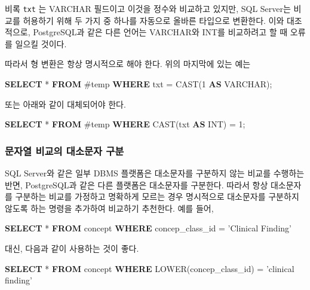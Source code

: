 \documentclass[11pt]{book}
\newenvironment{Shaded}{\begin{snugshade}}{\end{snugshade}}
\newcommand{\KeywordTok}[1]{\textcolor[rgb]{0.13,0.29,0.53}{\textbf{#1}}}
\newcommand{\DataTypeTok}[1]{\textcolor[rgb]{0.13,0.29,0.53}{#1}}
\newcommand{\DecValTok}[1]{\textcolor[rgb]{0.00,0.00,0.81}{#1}}
\newcommand{\StringTok}[1]{\textcolor[rgb]{0.31,0.60,0.02}{#1}}
\newcommand{\FunctionTok}[1]{\textcolor[rgb]{0.00,0.00,0.00}{#1}}
\newcommand{\NormalTok}[1]{#1}
\theoremstyle{definition}
\theoremstyle{definition}
\theoremstyle{definition}
\theoremstyle{remark}
\begin{document}
비록 \texttt{txt} 는 VARCHAR 필드이고 이것을 정수와 비교하고 있지만, SQL
Server는 비교를 허용하기 위해 두 가지 중 하나를 자동으로 올바른 타입으로
변환한다. 이와 대조적으로, PostgreSQL과 같은 다른 언어는 VARCHAR와 INT를
비교하려고 할 때 오류를 일으킬 것이다.

따라서 형 변환은 항상 명시적으로 해야 한다. 위의 마지막에 있는 예는

\begin{Shaded}
\begin{Highlighting}[]
\KeywordTok{SELECT}\NormalTok{ * }\KeywordTok{FROM}\NormalTok{ #temp }\KeywordTok{WHERE}\NormalTok{ txt = }\FunctionTok{CAST}\NormalTok{(}\DecValTok{1} \KeywordTok{AS} \DataTypeTok{VARCHAR}\NormalTok{);}
\end{Highlighting}
\end{Shaded}

또는 아래와 같이 대체되어야 한다.

\begin{Shaded}
\begin{Highlighting}[]
\KeywordTok{SELECT}\NormalTok{ * }\KeywordTok{FROM}\NormalTok{ #temp }\KeywordTok{WHERE} \FunctionTok{CAST}\NormalTok{(txt }\KeywordTok{AS} \DataTypeTok{INT}\NormalTok{) = }\DecValTok{1}\NormalTok{;}
\end{Highlighting}
\end{Shaded}

\subsubsection*{문자열 비교의 대소문자 구분}\label{---}

SQL Server와 같은 일부 DBMS 플랫폼은 대소문자를 구분하지 않는 비교를
수행하는 반면, PostgreSQL과 같은 다른 플랫폼은 대소문자를 구분한다.
따라서 항상 대소문자를 구분하는 비교를 가정하고 명확하게 모르는 경우
명시적으로 대소문자를 구분하지 않도록 하는 명령을 추가하여 비교하기
추천한다. 예를 들어,

\begin{Shaded}
\begin{Highlighting}[]
\KeywordTok{SELECT}\NormalTok{ * }\KeywordTok{FROM}\NormalTok{ concept }\KeywordTok{WHERE}\NormalTok{ concep_class_id = }\StringTok{'Clinical Finding'}
\end{Highlighting}
\end{Shaded}

대신, 다음과 같이 사용하는 것이 좋다.

\begin{Shaded}
\begin{Highlighting}[]
\KeywordTok{SELECT}\NormalTok{ * }\KeywordTok{FROM}\NormalTok{ concept }\KeywordTok{WHERE} \FunctionTok{LOWER}\NormalTok{(concep_class_id) = }\StringTok{'clinical finding'}
\end{Highlighting}
\end{Shaded}
\end{document}
